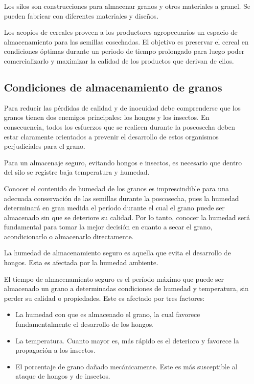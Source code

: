Los silos son construcciones para almacenar granos y otros materiales a granel. Se pueden fabricar con diferentes materiales y diseños. \citep{WEBSITE:6}

Los acopios de cereales proveen a los productores agropecuarios un espacio de almacenamiento para las semillas cosechadas. El objetivo es preservar el cereal en condiciones óptimas durante un periodo de tiempo prolongado para luego poder comercializarlo y maximizar la calidad de los productos que derivan de ellos. \citep{ARTICLE:1}

\subsection{Condiciones de almacenamiento de granos}

Para reducir las pérdidas de calidad y de inocuidad debe comprenderse que los granos tienen dos enemigos
principales: los hongos y los insectos. En consecuencia, todos los esfuerzos que se realicen durante la poscosecha deben estar claramente orientados a prevenir el desarrollo de estos organismos perjudiciales para el grano. \citep{ARTICLE:1}

Para un almacenaje seguro, evitando hongos e insectos, es necesario que dentro del silo se registre baja temperatura y humedad. 

Conocer el contenido de humedad de los granos es imprescindible para una adecuada conservación de las semillas durante la poscosecha, pues la humedad determinará en gran medida el período durante el cual el grano puede ser almacenado sin que se deteriore su calidad. Por lo tanto, conocer la humedad será fundamental para tomar la mejor decisión en cuanto a secar el grano, acondicionarlo o almacenarlo directamente.

La humedad de almacenamiento seguro es aquella que evita el desarrollo de hongos. Esta es afectada por la humedad ambiente.

El tiempo de almacenamiento seguro es el período máximo que puede ser almacenado un grano a determinadas condiciones de humedad y temperatura, sin perder su calidad o propiedades.
Este es afectado por tres factores:

\begin{itemize}
\item La humedad con que es almacenado el grano, la cual favorece fundamentalmente el desarrollo de los hongos.
\item La temperatura. Cuanto mayor es, más rápido es el deterioro y favorece la propagación a los insectos.
\item El porcentaje de grano dañado mecánicamente. Este es más susceptible al ataque de hongos y de insectos.
\end{itemize}

